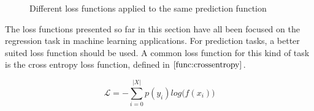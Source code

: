 \begin{figure}
    \centering
    \qquad

    \caption{Different loss functions applied to the same prediction function}%
    \label{fig:lossFunctions}%
\end{figure}

The loss functions presented so far in this section have all been focused on the regression task in machine learning applications.
For prediction tasks, a better suited loss function should be used. A common loss function for this kind of task
is the cross entropy loss function, defined in $ \eqref{func:crossentropy} $.

\[
    \mathcal{L} = - \sum_{i = 0}^{|X|}p(y_i) log\big(f(x_i)\big)
    \tag{2.5} \label{func:crossentropy}
\]



